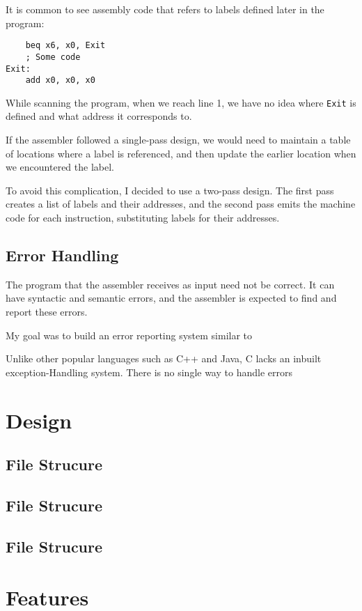 \documentclass{article}
\begin{document}
It is common to see assembly code that refers to labels defined later in the program:

\begin{verbatim}
    beq x6, x0, Exit
    ; Some code
Exit:
    add x0, x0, x0
\end{verbatim}

While scanning the program, when we reach line 1, we have no idea where \texttt{Exit}
is defined and what address it corresponds to.

If the assembler followed a single-pass design, we would need to maintain a table of locations
where a label is referenced, and then update the earlier location when we encountered the label.

To avoid this complication, I decided to use a two-pass design. The first pass
creates a list of labels and their addresses, and the second pass emits the machine code
for each instruction, substituting labels for their addresses. 

\subsection{Error Handling}

The program that the assembler receives as input need not be correct. It can have syntactic
and semantic errors, and the assembler is expected to find and report these errors.

My goal was to build an error reporting system similar to   

Unlike other popular languages such as C++ and Java, C lacks an inbuilt exception-Handling
system. There is no single way to handle errors



\section{Design}

\subsection{File Strucure}


\subsection{File Strucure}

\subsection{File Strucure}

\section{Features}

\section{}
\end{document}
